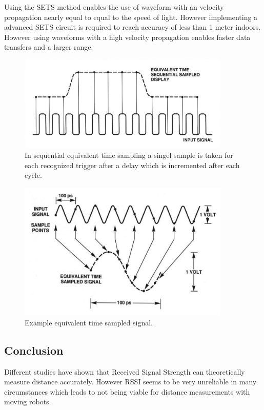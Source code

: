 \documentclass[10pt,a4paper]{article}
\begin{document}
Using the SETS method enables the use of waveform with an velocity propagation nearly equal to equal to the speed of light. However implementing a advanced SETS circuit is required to reach accuracy of less than 1 meter indoors.\cite{TOF} However using waveforms with a high velocity propagation enables faster data transfers and a larger range.\cite{TOF}

\begin{figure}[H]
\centering
\includegraphics[width=0.9\textwidth]{SETS.png}
\caption{In sequential equivalent time sampling a singel sample is taken for each recognized trigger after a delay which is incremented after each cycle.\cite{SETS}} 
\label{SETS}
\end{figure}

\begin{figure}[H]
\centering
\includegraphics[width=0.9\textwidth]{SETS2.png}
\caption{Example equivalent time sampled signal.\cite{SETS}} 
\label{SETS2}
\end{figure}
\newpage

\subsection{Conclusion}
Different studies have shown that Received Signal Strength can theoretically measure distance accurately. However RSSI seems to be very unreliable in many circumstances which leads to not being viable for distance measurements with moving robots. 
\end{document}
